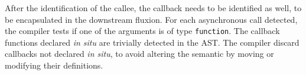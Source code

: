 After the identification of the callee, the callback needs to be identified as well, to be encapsulated in the downstream fluxion.
For each asynchronous call detected, the compiler tests if one of the arguments is of type \texttt{function}.
The callback functions declared \textit{in situ} are trivially detected in the AST.
The compiler discard callbacks not declared \textit{in situ}, to avoid altering the semantic by moving or modifying their definitions.





